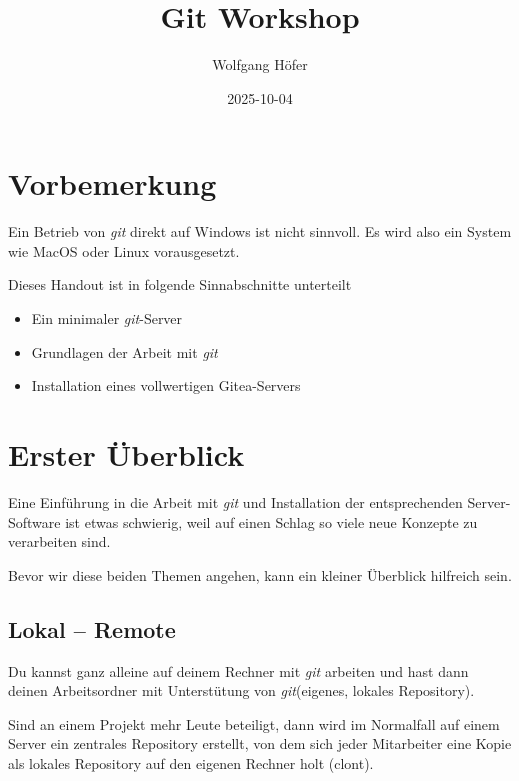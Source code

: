 \documentclass[
  letterpaper,
  DIV=11]{scrreprt}
\title{Git Workshop}
\author{Wolfgang Höfer}
\date{2025-10-04}
\makeatletter
\providecommand{\tightlist}{%
  \setlength{\itemsep}{0pt}\setlength{\parskip}{0pt}}\usepackage{longtable,booktabs,array}
\renewcommand{\maketitle}{\bgroup\setlength{\parindent}{0pt}
\begin{flushleft}
  {\sffamily\huge\textbf{\MakeUppercase{\@title}}} \vspace{0.3cm} \newline
  {\Large {\@subtitle}} \newline
  \@author
\end{flushleft}\egroup
}
\newcommand{\git}{\textit{git}\xspace}
\makeatother
\begin{document}
\maketitle

\pagestyle{mystyle}



\chapter*{Vorbemerkung}\label{vorbemerkung}


Ein Betrieb von \git direkt auf Windows ist nicht sinnvoll. Es wird also
ein System wie MacOS oder Linux vorausgesetzt.

Dieses Handout ist in folgende Sinnabschnitte unterteilt

\begin{itemize}
\tightlist
\item
  Ein minimaler \git-Server
\item
  Grundlagen der Arbeit mit \git
\item
  Installation eines vollwertigen Gitea-Servers
\end{itemize}


\chapter{Erster Überblick}\label{erster-uxfcberblick}

Eine Einführung in die Arbeit mit \git und Installation der
entsprechenden Server-Software ist etwas schwierig, weil auf einen
Schlag so viele neue Konzepte zu verarbeiten sind.

Bevor wir diese beiden Themen angehen, kann ein kleiner Überblick
hilfreich sein.

\section{Lokal -- Remote}\label{lokal-remote}

Du kannst ganz alleine auf deinem Rechner mit \git arbeiten und hast
dann deinen Arbeitsordner mit Unterstütung von \git (eigenes, lokales
Repository).

Sind an einem Projekt mehr Leute beteiligt, dann wird im Normalfall auf
einem Server ein zentrales Repository erstellt, von dem sich jeder
Mitarbeiter eine Kopie als lokales Repository auf den eigenen Rechner
holt (clont).
\end{document}
